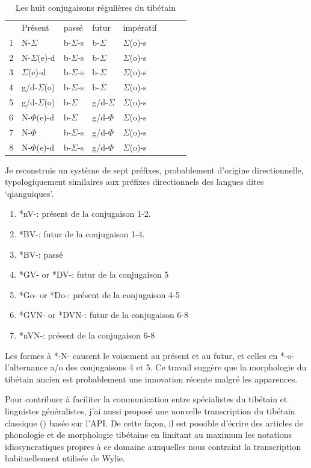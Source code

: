 \documentclass[oldfontcommands,oneside,a4paper,11pt]{memoir}
\newcommand{\sig}{\begin{math}\Sigma\end{math}}
\newcommand{\phone}{\begin{math}\Phi\end{math}}
\begin{document}
\begin{table}[H]
\caption{Les huit conjugaisons régulières du tibétain } 
\begin{tabular}{llllllll} 
 	&	Présent	&	passé	&	futur	&	impératif	\\
1	&	N-\sig{}	&	b-\sig{}-s	&	b-\sig{}	&	\sig{}(o)-s	\\
2	&	N-\sig{}(e)-d	&	b-\sig{}-s	&	b-\sig{}	&	\sig{}(o)-s	\\
3	&	\sig{}(e)-d	&	b-\sig{}-s	&	b-\sig{}	&	\sig{}(o)-s	\\
4	&	g/d-\sig{}(o)	&	b-\sig{}-s	&	b-\sig{}	&	\sig{}(o)-s	\\
5	&	g/d-\sig{}(o)	&	b-\sig{}	&	g/d-\sig{}	&	\sig{}(o)-s	\\
6	&	N-\phone(e)-d	&	b-\sig{}	&	g/d-\phone{}	&	\sig{}(o)-s	\\
7	&	N-\phone	&	b-\sig{}-s	&	g/d-\phone{}	&	\sig{}(o)-s	\\
8	&	N-\phone(e)-d	&	b-\sig{}-s	&	g/d-\phone{}	&	\sig{}(o)-s	\\
\end{tabular}
\end{table}

Je reconstruis un système de sept préfixes, probablement d'origine directionnelle, typologiquement similaires aux préfixes directionnels des langues dites `qianguiques'.

\begin{enumerate}

\item *nV-: présent de la conjugaison 1-2.
\item *BV-: futur de  la   conjugaison 1-4.
\item *BV-: passé
\item *GV- or *DV-: futur de  la   conjugaison 5
\item *Go- or *Do-: présent de la conjugaison 4-5
\item *GVN- or *DVN-: futur de  la   conjugaison 6-8
\item *nVN-:  présent de la conjugaison 6-8
\end{enumerate}
Les formes à *-N- causent le voisement au présent et au futur, et celles en *-o- l'alternance a/o des conjugaisons 4 et 5. Ce travail suggère que la morphologie du tibétain ancien est probablement une innovation récente malgré les apparences.

Pour contribuer à faciliter la communication entre spécialistes du tibétain et linguistes généralistes, j'ai aussi proposé une nouvelle transcription du tibétain classique (\citealt{jacques12transcription}) basée sur l'API. De cette façon, il est possible d'écrire des articles de phonologie et de morphologie tibétaine en limitant au maximum les notations idiosyncratiques propres à ce domaine auxquelles nous contraint la transcription habituellement utilisée de Wylie.
\end{document}
